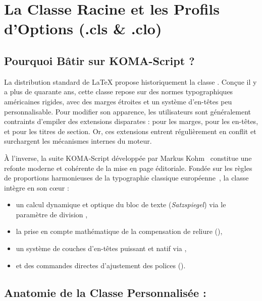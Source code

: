 \chapter{La Classe Racine et les Profils d'Options (.cls \& .clo)}
\label{chap:classe-et-options}

\section{Pourquoi Bâtir sur KOMA-Script  ?}
\label{sec:pourquoi-scrbook}

La distribution standard de \LaTeX{} propose historiquement la classe .
Conçue il y a plus de quarante ans, cette classe repose sur des normes typographiques américaines rigides,
avec des marges étroites et un système d'en-têtes peu personnalisable.
Pour modifier son apparence, les utilisateurs sont généralement contraints d'empiler des extensions disparates :
 pour les marges,
 pour les en-têtes,
et  pour les titres de section.
Or, ces extensions entrent régulièrement en conflit et surchargent les mécanismes internes du moteur.

À l'inverse, la suite KOMA-Script développée par Markus Kohm~\autocite{kohm2024koma}
constitue une refonte moderne et cohérente de la mise en page éditoriale.
Fondée sur les règles de proportions harmonieuses de la typographie classique européenne~\autocite{bringhurst2004elements,mittelbach2023latex},
la classe  intègre en son c\oe{}ur :
\begin{itemize}
  \item un calcul dynamique et optique du bloc de texte (\textit{Satzspiegel}) via le paramètre de division ,
  \item la prise en compte mathématique de la compensation de reliure (),
  \item un système de couches d'en-têtes puissant et natif via ,
  \item et des commandes directes d'ajustement des polices ().
\end{itemize}

\section{Anatomie de la Classe Personnalisée : }
\label{sec:anatomie-cls}


